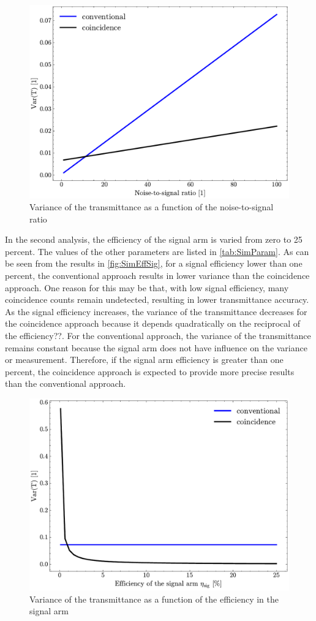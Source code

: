 \begin{figure}[b!]
	\centering
	\includegraphics[width=.7\textwidth]{Images/SimulationSweepSNR.pdf}
	\caption{Variance of the transmittance as a function of the noise-to-signal ratio}
	\label{fig:SimSNR}
\end{figure}\newline
In the second analysis, the efficiency of the signal arm is varied from zero to 25 percent. The values of the other parameters are listed in \autoref{tab:SimParam}. As can be seen from the results in \autoref{fig:SimEffSig}, for a signal efficiency lower than one percent, the conventional approach results in lower variance than the coincidence approach. One reason for this may be that, with low signal efficiency, many coincidence counts remain undetected, resulting in lower transmittance accuracy. As the signal efficiency increases, the variance of the transmittance decreases for the coincidence approach because it depends quadratically on the reciprocal of the efficiency??. For the conventional approach, the variance of the transmittance remains constant because the signal arm does not have influence on the variance or measurement. Therefore, if the signal arm efficiency is greater than one percent, the coincidence approach is expected to provide more precise results than the conventional approach.
\begin{figure}[tb!]
	\centering
	\includegraphics[width=.7\textwidth]{Images/SimulationSweepEffSig.pdf}
	\caption{Variance of the transmittance as a function of the efficiency in the signal arm}
	\label{fig:SimEffSig}
\end{figure}\newline
